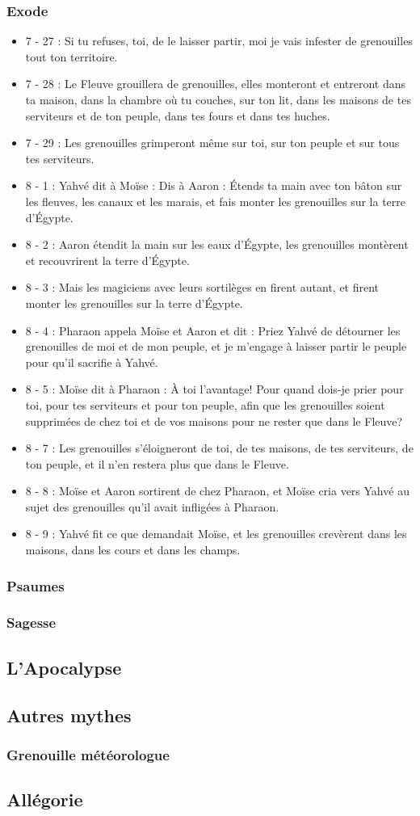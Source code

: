 \subsubsection{Exode}
\begin{itemize}
\item 7 - 27 : Si tu refuses, toi, de le laisser partir, moi je vais infester de grenouilles tout ton territoire.
\item 7 - 28 : Le Fleuve grouillera de grenouilles, elles monteront et entreront dans ta maison, dans la chambre où tu couches, sur ton lit, dans les maisons de tes serviteurs et de ton peuple, dans tes fours et dans tes huches.
\item 7 - 29 : Les grenouilles grimperont même sur toi, sur ton peuple et sur tous tes serviteurs.
\item 8 - 1 : Yahvé dit à Moïse : Dis à Aaron : Étends ta main avec ton bâton sur les fleuves, les canaux et les marais, et fais monter les grenouilles sur la terre d'Égypte.
\item 8 - 2 : Aaron étendit la main sur les eaux d'Égypte, les grenouilles montèrent et recouvrirent la terre d'Égypte.
\item 8 - 3 : Mais les magiciens avec leurs sortilèges en firent autant, et firent monter les grenouilles sur la terre d'Égypte.
\item 8 - 4 : Pharaon appela Moïse et Aaron et dit : Priez Yahvé de détourner les grenouilles de moi et de mon peuple, et je m'engage à laisser partir le peuple pour qu'il sacrifie à Yahvé.
\item 8 - 5 : Moïse dit à Pharaon : À toi l'avantage! Pour quand dois-je prier pour toi, pour tes serviteurs et pour ton peuple, afin que les grenouilles soient supprimées de chez toi et de vos maisons pour ne rester que dans le Fleuve?
\item 8 - 7 : Les grenouilles s'éloigneront de toi, de tes maisons, de tes serviteurs, de ton peuple, et il n'en restera plus que dans le Fleuve.
\item 8 - 8 : Moïse et Aaron sortirent de chez Pharaon, et Moïse cria vers Yahvé au sujet des grenouilles qu'il avait infligées à Pharaon.
\item 8 - 9 : Yahvé fit ce que demandait Moïse, et les grenouilles crevèrent dans les maisons, dans les cours et dans les champs.
\end{itemize}
\subsubsection{Psaumes}
\subsubsection{Sagesse}
\subsection{L'Apocalypse}

\subsection{Autres mythes}
\subsubsection{Grenouille météorologue}
\subsection{Allégorie}

